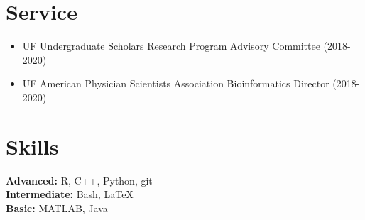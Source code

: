\documentclass[margin,centered]{res}
\newenvironment{list1}{
  \begin{list}{\ding{113}}{%
      \setlength{\itemsep}{0in}
      \setlength{\parsep}{0in} \setlength{\parskip}{0in}
      \setlength{\topsep}{0in} \setlength{\partopsep}{0in}
      \setlength{\leftmargin}{0.17in}}}{\end{list}}
\newenvironment{list2}{
  \begin{list}{$\bullet$}{%
      \setlength{\itemsep}{0in}
      \setlength{\parsep}{0in} \setlength{\parskip}{0in}
      \setlength{\topsep}{0in} \setlength{\partopsep}{0in}
      \setlength{\leftmargin}{0.2in}}}{\end{list}}
\begin{document}
\begin{resume}
\section{\sc Service}

\begin{itemize}
\item UF Undergraduate Scholars Research Program Advisory Committee (2018-2020)
\item UF American Physician Scientists Association Bioinformatics Director (2018-2020)
\end{itemize}

\section{\sc Skills}
{\bf Advanced:} R, C++, Python, git\\
{\bf Intermediate:} Bash, LaTeX\\
{\bf Basic:} MATLAB, Java






%
\thispagestyle{lastpage}
\end{resume}
\end{document}
